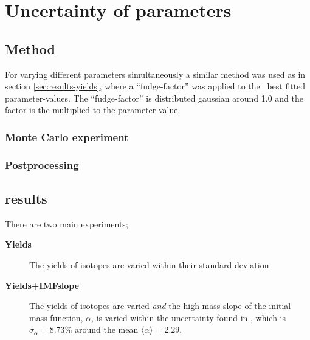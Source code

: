\section{Uncertainty of parameters}

\subsection{Method}
For varying different parameters simultaneously a similar method was used as in section \ref{sec:results-yields}, where a ``fudge-factor'' was applied to the \eris\ best fitted parameter-values.
The ``fudge-factor'' is distributed gaussian around 1.0 and the factor is the multiplied to the parameter-value.


\subsubsection{Monte Carlo experiment}

\subsubsection{Postprocessing}


\FloatBarrier

\subsection{results}
\newcommand\expone{\textbf{Yields}}
\newcommand\exptwo{\textbf{Yields+IMFslope}}
There are two main experiments;
\begin{description}
\item[\expone] The yields of isotopes are varied within their standard deviation 
\item[\exptwo] The yields of isotopes are varied \textit{and} the high mass slope of the initial mass function, $\alpha$, is varied within the uncertainty found in , which is $\sigma_{\alpha}=8.73\%$ around the mean $\langle \alpha \rangle = 2.29$.
\end{description}

